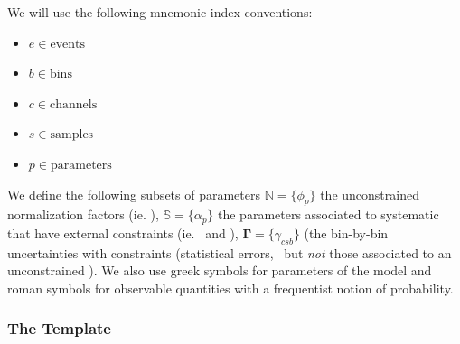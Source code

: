 We will use the following mnemonic index conventions:
\begin{itemize}
 \item $e\in \mathrm{events}$
 \item $b\in \mathrm{bins}$
 \item $c \in \mathrm{channels}$
 \item $s \in \mathrm{samples}$
 \item $p\in \mathrm{parameters}$ 
\end{itemize} 
We define the following subsets of parameters  $\mathbb{N}=\{\phi_p\}$ the unconstrained normalization factors (ie. \NF),  $\mathbb{S}=\{\alpha_p\}$ the parameters associated to systematic that have external constraints (ie. \OS\ and \HS), $\mathbf{\Gamma}=\{\gamma_{csb}\}$ (the bin-by-bin uncertainties with constraints (statistical errors, \SS\ but \textit{not} those associated to an unconstrained \SF).  We also use greek symbols for parameters of the model and roman symbols for observable quantities with a frequentist notion of probability.




\subsubsection{The Template}


